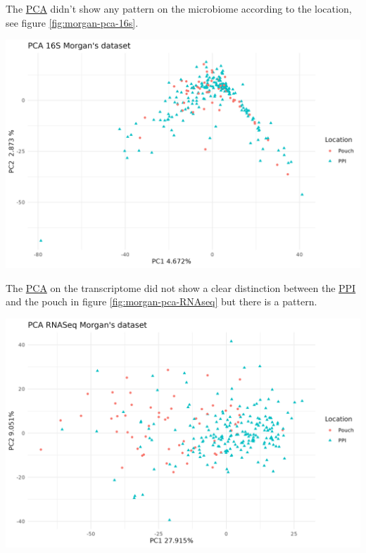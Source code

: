\documentclass[
  12pt,
  a4paper,
  twoside,
  openright]{book}
\let\origfigure\figure
\let\endorigfigure\endfigure
\renewenvironment{figure}[1][2] {
    \expandafter\origfigure\expandafter[!htbp]
} {
    \endorigfigure
}
\begin{document}
The \protect\hyperlink{acronyms_PCA}{PCA} didn't show any pattern on the microbiome according to the location, see figure \ref{fig:morgan-pca-16s}.

\begin{figure}
\includegraphics[width=1\linewidth]{images/PCA_16S_morgan} \caption[PCA of 16S of the Morgan's dataset]{PCA of 16S of the Morgan's dataset. There seems to be quite a diverse microbiota based on the first dimension. Each point represents a sample (colored and shaped by location).}\label{fig:morgan-pca-16s}
\end{figure}

The \protect\hyperlink{acronyms_PCA}{PCA} on the transcriptome did not show a clear distinction between the \protect\hyperlink{acronyms_PPI}{PPI} and the pouch in figure \ref{fig:morgan-pca-RNAseq} but there is a pattern.

\begin{figure}
\includegraphics[width=1\linewidth]{images/PCA_RNASeq_morgan} \caption[PCA of RNAseq of the Morgan's dataset]{PCA of RNAseq of the Morgan's dataset. There is no clear separation of the two locations on the first dimensions of the PCA. Each point represents a sample (colored and shaped by location).}\label{fig:morgan-pca-RNAseq}
\end{figure}
\end{document}
